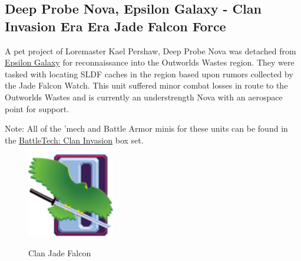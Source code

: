 \subsection{Deep Probe Nova, Epsilon Galaxy - Clan Invasion Era Era Jade Falcon Force}

A pet project of Loremaster Kael Pershaw, Deep Probe Nova was detached from \href{https://www.sarna.net/wiki/Epsilon_Galaxy_(Clan_Jade_Falcon)}{Epsilon Galaxy} for reconnaissance into the Outworlds Wastes region.
They were tasked with locating SLDF caches in the region based upon rumors collected by the Jade Falcon Watch.
This unit suffered minor combat losses in route to the Outworlds Wastes and is currently an understrength Nova with an aerospace point for support.
          	
Note: All of the 'mech and Battle Armor minis for these units can be found in the \href{https://www.sarna.net/wiki/BattleTech:_Clan_Invasion}{BattleTech: Clan Invasion} box set.

\begin{figure}[!h]
  \centering
  \includegraphics[alt='Clan Jade Falcon Logo', width=1.5in, height=1.444in]{img/Jade-Falcon.png}
  \caption*{Clan Jade Falcon}
\end{figure}

